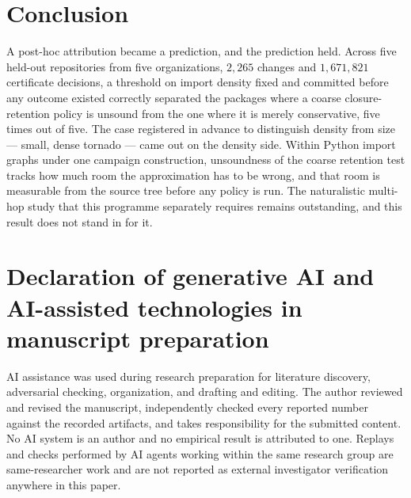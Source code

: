 \documentclass[11pt]{article}
\begin{document}
\section{Conclusion}
A post-hoc attribution became a prediction, and the prediction held. Across five held-out repositories from five organizations, $2{,}265$ changes and $1{,}671{,}821$ certificate decisions, a threshold on import density fixed and committed before any outcome existed correctly separated the packages where a coarse closure-retention policy is unsound from the one where it is merely conservative, five times out of five. The case registered in advance to distinguish density from size --- small, dense tornado --- came out on the density side. Within Python import graphs under one campaign construction, unsoundness of the coarse retention test tracks how much room the approximation has to be wrong, and that room is measurable from the source tree before any policy is run. The naturalistic multi-hop study that this programme separately requires remains outstanding, and this result does not stand in for it.

\section*{Declaration of generative AI and AI-assisted technologies in manuscript preparation}
AI assistance was used during research preparation for literature discovery, adversarial checking, organization, and drafting and editing. The author reviewed and revised the manuscript, independently checked every reported number against the recorded artifacts, and takes responsibility for the submitted content. No AI system is an author and no empirical result is attributed to one. Replays and checks performed by AI agents working within the same research group are same-researcher work and are not reported as external investigator verification anywhere in this paper.
\end{document}
